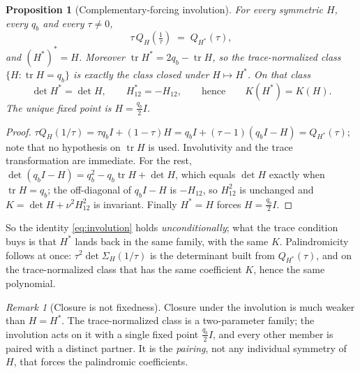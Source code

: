 \documentclass[11pt]{article}
\theoremstyle{plain}
\newtheorem{proposition}[theorem]{Proposition}
\theoremstyle{definition}
\theoremstyle{remark}
\newtheorem{remark}[theorem]{Remark}
\newcommand{\tr}{\operatorname{tr}}
\newcommand{\Sig}{\Sigma}
\begin{document}
\begin{proposition}[Complementary-forcing involution]\label{prop:involution}
For every symmetric $H$, every $q_b$ and every $\tau\neq0$,
\begin{equation}
  \tau\,Q_H\!\left(\tfrac1\tau\right) \;=\; Q_{H^{*}}(\tau), \label{eq:involution}
\end{equation}
and $(H^{*})^{*}=H$. Moreover $\tr H^{*}=2q_b-\tr H$, so the trace-normalized class
$\{H:\tr H=q_b\}$ is exactly the class closed under $H\mapsto H^{*}$. On that class
\begin{equation}
  \det H^{*}=\det H, \qquad H^{*}_{12}=-H_{12}, \qquad\text{hence}\qquad K(H^{*})=K(H).
  \label{eq:Kinvariant}
\end{equation}
The unique fixed point is $H=\tfrac{q_b}{2}I$.
\end{proposition}

\begin{proof}
$\tau Q_H(1/\tau)=\tau q_bI+(1-\tau)H=q_bI+(\tau-1)(q_bI-H)=Q_{H^{*}}(\tau)$; note that no
hypothesis on $\tr H$ is used. Involutivity and the trace transformation are immediate. For the
rest, $\det(q_bI-H)=q_b^2-q_b\tr H+\det H$, which equals $\det H$ exactly when $\tr H=q_b$; the
off-diagonal of $q_bI-H$ is $-H_{12}$, so $H_{12}^2$ is unchanged and
$K=\det H+\nu^2H_{12}^2$ is invariant. Finally $H^{*}=H$ forces $H=\tfrac{q_b}{2}I$.
\end{proof}

So the identity \eqref{eq:involution} holds \emph{unconditionally}; what the trace condition buys
is that $H^{*}$ lands back in the same family, with the same $K$. Palindromicity follows at once:
$\tau^2\det\Sig_H(1/\tau)$ is the determinant built from $Q_{H^{*}}(\tau)$, and on the
trace-normalized class that has the same coefficient $K$, hence the same polynomial.

\begin{remark}[Closure is not fixedness]\label{rem:closurenotfixed}
Closure under the involution is much weaker than $H=H^{*}$. The trace-normalized class is a
two-parameter family; the involution acts on it with a single fixed point $\tfrac{q_b}{2}I$, and
every other member is paired with a distinct partner. It is the \emph{pairing}, not any
individual symmetry of $H$, that forces the palindromic coefficients.
\end{remark}
\end{document}
